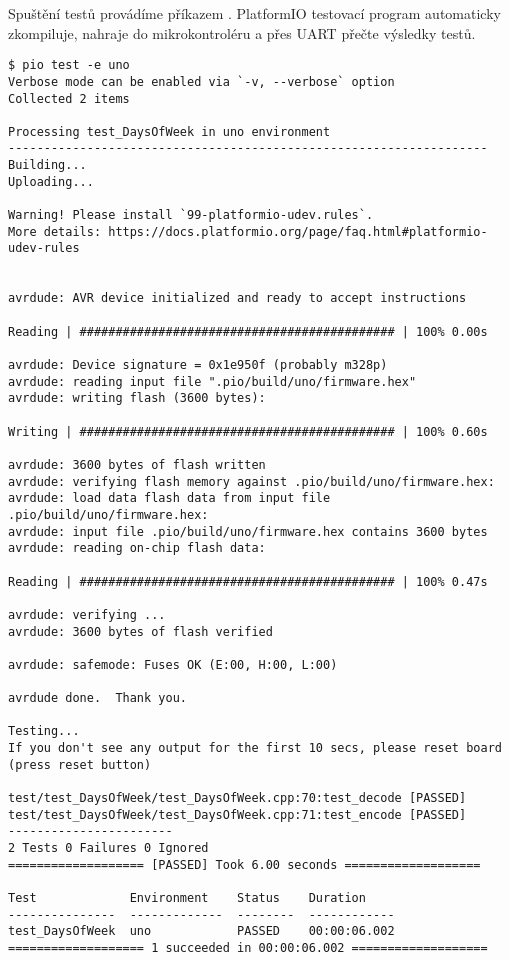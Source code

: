 Spuštění testů provádíme příkazem . PlatformIO testovací
program automaticky zkompiluje, nahraje do mikrokontroléru a přes UART přečte
výsledky testů.
\begin{lstlisting}[style=terminal,columns=fixed]
$ pio test -e uno
Verbose mode can be enabled via `-v, --verbose` option
Collected 2 items

Processing test_DaysOfWeek in uno environment
-------------------------------------------------------------------
Building...
Uploading...

Warning! Please install `99-platformio-udev.rules`. 
More details: https://docs.platformio.org/page/faq.html#platformio-udev-rules


avrdude: AVR device initialized and ready to accept instructions

Reading | ############################################ | 100% 0.00s

avrdude: Device signature = 0x1e950f (probably m328p)
avrdude: reading input file ".pio/build/uno/firmware.hex"
avrdude: writing flash (3600 bytes):

Writing | ############################################ | 100% 0.60s

avrdude: 3600 bytes of flash written
avrdude: verifying flash memory against .pio/build/uno/firmware.hex:
avrdude: load data flash data from input file .pio/build/uno/firmware.hex:
avrdude: input file .pio/build/uno/firmware.hex contains 3600 bytes
avrdude: reading on-chip flash data:

Reading | ############################################ | 100% 0.47s

avrdude: verifying ...
avrdude: 3600 bytes of flash verified

avrdude: safemode: Fuses OK (E:00, H:00, L:00)

avrdude done.  Thank you.

Testing...
If you don't see any output for the first 10 secs, please reset board (press reset button)

test/test_DaysOfWeek/test_DaysOfWeek.cpp:70:test_decode	[PASSED]
test/test_DaysOfWeek/test_DaysOfWeek.cpp:71:test_encode	[PASSED]
-----------------------
2 Tests 0 Failures 0 Ignored
=================== [PASSED] Took 6.00 seconds ===================

Test             Environment    Status    Duration
---------------  -------------  --------  ------------
test_DaysOfWeek  uno            PASSED    00:00:06.002
=================== 1 succeeded in 00:00:06.002 ===================
\end{lstlisting}

